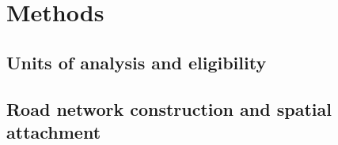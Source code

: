 
\section{Methods}
\label{sec:methods}


\subsection{Units of analysis and eligibility}
\label{sec:methods-units}


\subsection{Road network construction and spatial attachment}
\label{sec:network}
\label{sec:methods-network}

